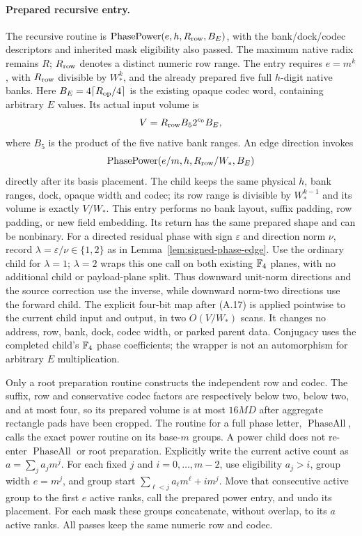 \paragraph{Prepared recursive entry.}
The recursive routine is $\operatorname{PhasePower}(e,h,R_{\rm row},B_E)$,
with the bank/dock/codec descriptors and inherited mask eligibility
also passed. The maximum native radix remains $R$; $R_{\rm row}$
denotes a distinct numeric row range. The entry requires $e=m^k$,
with $R_{\rm row}$ divisible
by $W_*^k$, and the already prepared five full $h$-digit native banks.
Here $B_E=4\lceil R_{\rm op}/4\rceil$ is the existing opaque codec
word, containing arbitrary $E$ values. Its actual input volume is
\[
 V=R_{\rm row}B_5 2^{c_0}B_E,
\]
where $B_5$ is the product of the five native bank ranges. An edge
direction invokes
\[
 \operatorname{PhasePower}(e/m,h,R_{\rm row}/W_*,B_E)
\]
directly after its basis placement. The child keeps the same physical $h$, bank ranges,
dock, opaque width and codec; its row range is divisible by
$W_*^{k-1}$ and its volume is exactly $V/W_*$. This entry performs
no bank layout, suffix padding, row padding, or new field embedding.
Its return has the same prepared shape and can be nonbinary.
For a directed residual phase with sign $\varepsilon$ and direction
norm $\nu$, record $\lambda=\varepsilon/\nu\in\{1,2\}$ as in
Lemma~\ref{lem:signed-phase-edge}. Use the ordinary child for
$\lambda=1$; $\lambda=2$ wraps this one call on both existing $\mathbb F_4$
planes, with no additional child or payload-plane split. Thus downward
unit-norm directions and the source correction use the inverse, while
downward norm-two directions use the forward child.
The explicit four-bit map after (A.17) is applied pointwise to the
current child input and output, in two $O(V/W_*)$ scans. It changes
no address, row, bank, dock, codec width, or parked parent data.
Conjugacy uses the completed child's $\mathbb F_4$ phase coefficients;
the wrapper is not an automorphism for arbitrary $E$ multiplication.

Only a root preparation routine constructs the independent row and
codec. The suffix, row and conservative codec factors are respectively
below two, below two, and at most four, so its prepared volume is
at most $16MD$ after aggregate rectangle pads have been cropped.
The routine for a full phase letter, $\operatorname{PhaseAll}$,
calls the exact power routine on its base-$m$ groups. A power child
does not re-enter $\operatorname{PhaseAll}$ or root preparation.
Explicitly write the current active count as
$a=\sum_j a_jm^j$. For each fixed $j$ and $i=0,\ldots,m-2$,
use eligibility $a_j>i$, group width $e=m^j$, and group start
$\sum_{\ell<j}a_\ell m^\ell+i m^j$. Move that consecutive active
group to the first $e$ active ranks, call the prepared power entry,
and undo its placement. For each mask these groups concatenate,
without overlap, to its $a$ active ranks. All passes keep the same
numeric row and codec.

